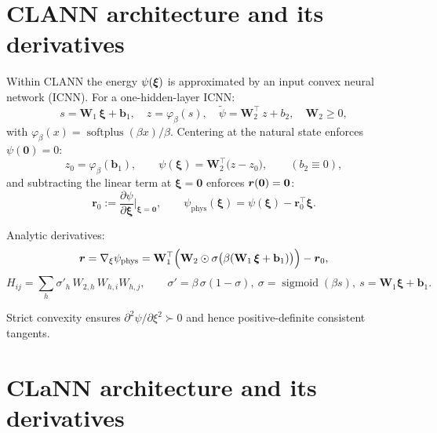 \section{CLANN architecture and its derivatives}

Within CLANN the energy $\psi(\boldsymbol{\xi})$ is approximated by an input convex neural network (ICNN). For a one-hidden-layer ICNN:
\begin{equation}
  s = \mathbf W_1 \, \boldsymbol{\xi} + \mathbf b_1,\quad
  z = \varphi_{\beta}(s),\quad
  \tilde{\psi} = \mathbf W_2^{\top} \, z + b_2,\quad \mathbf W_2 \ge 0,
  \label{eq:icnn_onelayer-en}
\end{equation}
with $\varphi_{\beta}(x)=\operatorname{softplus}(\beta x)/\beta$. Centering at the natural state enforces $\psi(\mathbf 0)=0$:
\begin{equation}
  z_0 = \varphi_{\beta}(\mathbf b_1),\qquad
  \psi(\boldsymbol{\xi}) = \mathbf W_2^{\top}\big(z - z_0\big),\qquad (b_2 \equiv 0),
  \label{eq:center_psi-en}
\end{equation}
and subtracting the linear term at $\boldsymbol{\xi}=\mathbf 0$ enforces $\boldsymbol{r}(\mathbf 0)=\mathbf 0$:
\begin{equation}
  \mathbf r_0 := \frac{\partial \psi}{\partial \boldsymbol{\xi}}\bigg|_{\boldsymbol{\xi}=\mathbf 0},\qquad
  \psi_{\mathrm{phys}}(\boldsymbol{\xi}) = \psi(\boldsymbol{\xi}) - \mathbf r_0^{\top}\boldsymbol{\xi}.
  \label{eq:phys_energy-en}
\end{equation}

Analytic derivatives:
\begin{equation}
  \boldsymbol{r} = \nabla_{\xi} \psi_{\mathrm{phys}} = \mathbf W_1^{\top} \Big( \mathbf W_2 \odot \sigma\big(\beta (\mathbf W_1 \, \boldsymbol{\xi} + \mathbf b_1)\big) \Big) - \boldsymbol{r}_0,
  \label{eq:energy_gradient-en}
\end{equation}
\begin{equation}
  H_{ij} = \sum_h \sigma'_h \, W_{2,h} \, W_{h,i} W_{h,j},\qquad \sigma' = \beta\,\sigma(1-\sigma),\ \sigma=\operatorname{sigmoid}(\beta s),\ s=\mathbf W_1\boldsymbol{\xi}+\mathbf b_1.
  \label{eq:energy_hessian-en}
\end{equation}

Strict convexity ensures $\partial^2\psi/\partial\xi^2\succ 0$ and hence positive-definite consistent tangents.

\section{CLaNN architecture and its derivatives}

